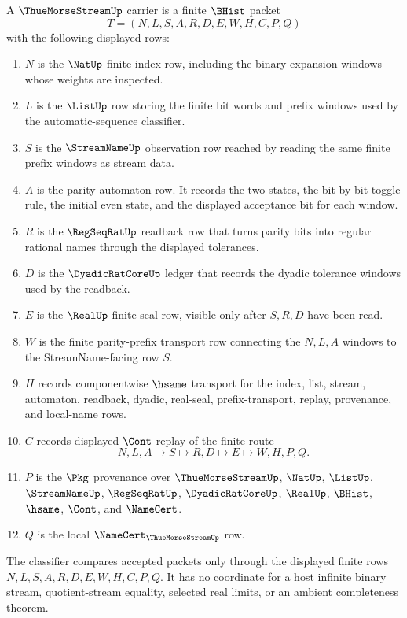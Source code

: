 \begin{definition}\label{def:thue-morse-carrier}
A $\ThueMorseStreamUp$ carrier is a finite $\BHist$ packet
$$
T=(N,L,S,A,R,D,E,W,H,C,P,Q)
$$
with the following displayed rows:
\begin{enumerate}
\item $N$ is the $\NatUp$ finite index row, including the binary expansion windows whose weights are inspected.
\item $L$ is the $\ListUp$ row storing the finite bit words and prefix windows used by the automatic-sequence classifier.
\item $S$ is the $\StreamNameUp$ observation row reached by reading the same finite prefix windows as stream data.
\item $A$ is the parity-automaton row. It records the two states, the bit-by-bit toggle rule, the initial even state, and the displayed acceptance bit for each window.
\item $R$ is the $\RegSeqRatUp$ readback row that turns parity bits into regular rational names through the displayed tolerances.
\item $D$ is the $\DyadicRatCoreUp$ ledger that records the dyadic tolerance windows used by the readback.
\item $E$ is the $\RealUp$ finite seal row, visible only after $S,R,D$ have been read.
\item $W$ is the finite parity-prefix transport row connecting the $N,L,A$ windows to the StreamName-facing row $S$.
\item $H$ records componentwise $\hsame$ transport for the index, list, stream, automaton, readback, dyadic, real-seal, prefix-transport, replay, provenance, and local-name rows.
\item $C$ records displayed $\Cont$ replay of the finite route
$$
N,L,A \longmapsto S \longmapsto R,D \longmapsto E \longmapsto W,H,P,Q .
$$
\item $P$ is the $\Pkg$ provenance over $\ThueMorseStreamUp$, $\NatUp$, $\ListUp$, $\StreamNameUp$, $\RegSeqRatUp$, $\DyadicRatCoreUp$, $\RealUp$, $\BHist$, $\hsame$, $\Cont$, and $\NameCert$.
\item $Q$ is the local $\NameCert_{\ThueMorseStreamUp}$ row.
\end{enumerate}
The classifier compares accepted packets only through the displayed finite rows $N,L,S,A,R,D,E,W,H,C,P,Q$. It has no coordinate for a host infinite binary stream, quotient-stream equality, selected real limits, or an ambient completeness theorem.
\end{definition}

